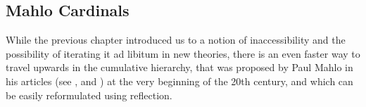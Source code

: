 \begin{comment}
 \newline\newline
 The next part, proving $\bold{(iii)} \then \bold{(ii)}$, should be elementary since $C$ is closed unbounded, which means that it contains at least countably many elements but we need only one such $\alpha$ to satisfy (\ref{def:reflection_2}).
 \newline
 Finally, we shall prove that $(ii) \then \bold{(i)}$. Since it obviously holds that $\kappa > \omega$, we have yet to prove that $\kappa$ is regular and a~strong limit. Let's argue by contradiction that it is regular. 
 If it wasn't, there would be a~$\beta < \kappa$ and a~function $F: \beta \implies \kappa$ with range unbounded in $\kappa$. Set $R = \{\beta\} \cup F$. By hypothesis there is an $\alpha < \kappa$ such that $\langle V_\alpha, \in, R \cap V_\alpha \rangle \prec \langle V_\kappa, \in, R \rangle$. Since $\beta$ is the single ordinal in R, $\beta \in V_\alpha$ by elementarity. This yields the desired contradiction since the domain if $F \cap V_\alpha$ cannot be all of $\beta$.
 \newline\newline
 Next, let's see whether $\kappa$ is indeed a~strong limit, again by contradiction. If not, there would be a~$\lambda < \kappa$ such that $2^\lambda \geq \kappa$. Let $G: \power{\lambda} \implies \kappa$ be surjective and set $R = \{\lambda + 1\} \cup G$. By hypothesis, there is an $\alpha < \kappa$ such that $\langle V_\alpha, \in, R \cap V_\alpha \rangle \prec \langle V_\kappa, \in, R \rangle$. $\lambda + 1 \in V_\alpha$ and so $\power{\lambda} \in V_\alpha$, but this is again a~contradiction.
\end{proof}
\
\end{comment}



\subsection{Mahlo Cardinals}

While the previous chapter introduced us to a notion of inaccessibility and the possibility of iterating it ad libitum in new theories, there is an even faster way to travel upwards in the cumulative hierarchy, that was proposed by Paul Mahlo in his articles (see \cite{Mahlo11}, \cite{Mahlo12} and \cite{Mahlo13}) at the very beginning of the 20th century, and which can be easily reformulated using reflection.

